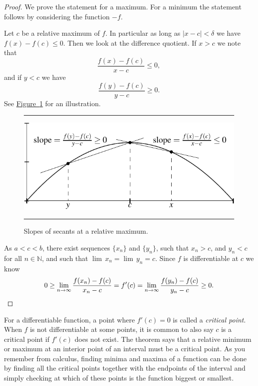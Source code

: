 \documentclass[12pt]{book}
\newenvironment{myfigureht}{%
\begin{figure}[h!t]
\noindent\rule{\textwidth}{0.4pt}\vspace{12pt}\par\centering}%
{\par\noindent\rule{\textwidth}{0.4pt}
\end{figure}}
\newcommand{\abs}[1]{\left\lvert {#1} \right\rvert}
\newcommand{\N}{{\mathbb{N}}}
\newcommand{\myindex}[1]{#1\index{#1}}
\theoremstyle{plain}
\theoremstyle{remark}
\theoremstyle{definition}
\theoremstyle{exercise}
\theoremstyle{example}
\newcommand{\figureref}[1]{\hyperref[#1]{Figure~\ref*{#1}}}
\begin{document}
\begin{proof}
We prove the statement for a maximum.  For a minimum the statement
follows by considering the function $-f$.

Let $c$ be a relative maximum of $f$.  In particular as long
as $\abs{x-c} < \delta$ we have $f(x)-f(c) \leq 0$.
Then we look at the difference
quotient.  If $x > c$ we note that
\begin{equation*}
\frac{f(x)-f(c)}{x-c} \leq 0 ,
\end{equation*}
and if $y < c$ we have
\begin{equation*}
\frac{f(y)-f(c)}{y-c} \geq 0 .
\end{equation*}
See \figureref{fig:critpt} for an illustration.
\begin{myfigureht}
\includegraphics{figures/critpt}
\caption{Slopes of secants at a relative maximum.\label{fig:critpt}}
\end{myfigureht}

As $a < c < b$, there exist
sequences $\{ x_n\}$ and $\{ y_n \}$, such
that $x_n > c$, and
$y_n < c$ for all $n \in \N$, and such that
 $\lim\, x_n = \lim\, y_n = c$.
Since $f$
is differentiable at $c$ we know 
\begin{equation*}
0 \geq \lim_{n\to\infty} \frac{f(x_n)-f(c)}{x_n-c} 
=
f'(c)
=
\lim_{n\to\infty} \frac{f(y_n)-f(c)}{y_n-c} \geq 0.  \qedhere
\end{equation*}
\end{proof}

For a differentiable function, a point where 
$f'(c) = 0$ is called a \emph{\myindex{critical point}}.  When $f$ is not
differentiable at some points,
it is common to also say $c$ is a critical point
if $f'(c)$ does not exist.
The theorem says that a relative minimum or maximum at an interior point
of an interval must be a critical point.
As you remember from calculus, finding minima and maxima of a function can
be done by finding all the critical points together with the endpoints of
the interval and simply checking at which of these points
is the function biggest or smallest.
\end{document}
